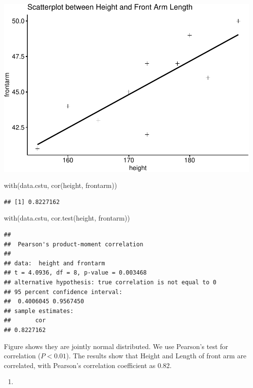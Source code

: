 \documentclass{article}
\newenvironment{Shaded}{\begin{snugshade}}{\end{snugshade}}
\newcommand{\FunctionTok}[1]{\textcolor[rgb]{0.00,0.00,0.00}{#1}}
\newcommand{\NormalTok}[1]{#1}
\begin{document}
\includegraphics{Reference_solutions_files/figure-latex/unnamed-chunk-17-1.pdf}

\begin{Shaded}
\begin{Highlighting}[]
\FunctionTok{with}\NormalTok{(data.cstu, }\FunctionTok{cor}\NormalTok{(height, frontarm))}
\end{Highlighting}
\end{Shaded}

\begin{verbatim}
## [1] 0.8227162
\end{verbatim}

\begin{Shaded}
\begin{Highlighting}[]
\FunctionTok{with}\NormalTok{(data.cstu, }\FunctionTok{cor.test}\NormalTok{(height, frontarm))}
\end{Highlighting}
\end{Shaded}

\begin{verbatim}
## 
##  Pearson's product-moment correlation
## 
## data:  height and frontarm
## t = 4.0936, df = 8, p-value = 0.003468
## alternative hypothesis: true correlation is not equal to 0
## 95 percent confidence interval:
##  0.4006045 0.9567450
## sample estimates:
##       cor 
## 0.8227162
\end{verbatim}

Figure shows they are jointly normal distributed. We use Pearson's test
for correlation (\(P < 0.01\)). The results show that Height and Length
of front arm are correlated, with Pearson's correlation coefficient as
0.82.

\begin{enumerate}
\def\labelenumi{(\arabic{enumi})}
\setcounter{enumi}{1}
\tightlist
\item
\end{enumerate}
\end{document}
